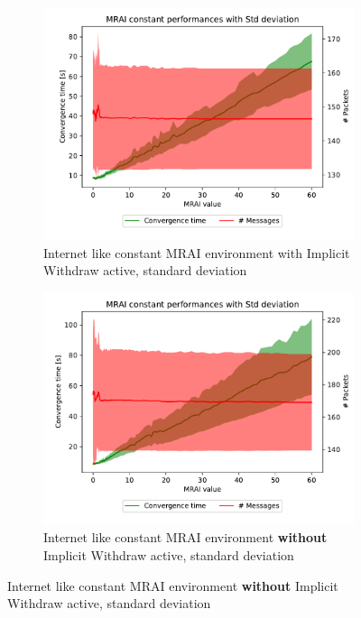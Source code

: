 \documentclass[10pt,conference,letterpaper]{IEEEtran}
\newcommand{\figwidth}{0.78}
\begin{document}
\begin{figure}[tb]
	\centering

	\begin{subfigure}{\columnwidth}
		\centering
		\includegraphics[width=\figwidth\columnwidth]{images/internet_like/graph-100-constant/mrai_evolution_std_alpha}
		\caption{Internet like constant \ac{MRAI} environment with Implicit Withdraw active, standard deviation}
		\label{fig:constant_IW_mrai_evolution_std_a}
		\qquad
	\end{subfigure}

	\begin{subfigure}{\columnwidth}
		\centering
		\includegraphics[width=\figwidth\columnwidth]{images/internet_like/graph-100-constant-noIW/mrai_evolution_std_alpha}
		\caption{Internet like constant \ac{MRAI} environment \textbf{without} Implicit Withdraw active, standard deviation}
		\label{fig:constant_noIW_mrai_evolution_std}
		\qquad
	\end{subfigure}


\end{figure}
\end{document}
